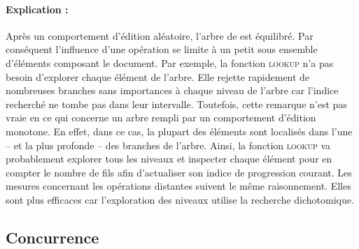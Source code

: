 \paragraph{Explication :} Après un comportement d'édition aléatoire, l'arbre de
\LSEQ est équilibré. Par conséquent l'influence d'une opération se limite à un
petit sous ensemble d'éléments composant le document. Par exemple, la fonction
\textsc{lookup} n'a pas besoin d'explorer chaque élément de l'arbre. Elle rejette
rapidement de nombreuses branches sans importances à chaque niveau de l'arbre
car l'indice recherché ne tombe pas dans leur intervalle. Toutefois, cette
remarque n'est pas vraie en ce qui concerne un arbre rempli par un comportement
d'édition monotone. En effet, dans ce cas, la plupart des éléments sont
localisés dans l'une -- et la plus profonde -- des branches de l'arbre. Ainsi,
la fonction \textsc{lookup} va probablement explorer tous les niveaux et
inspecter chaque élément pour en compter le nombre de fils afin d'actualiser son
indice de progression courant. Les mesures concernant les opérations distantes
suivent le même raisonnement. Elles sont plus efficaces car l'exploration des
niveaux utilise la recherche dichotomique.


\subsection{Concurrence}

